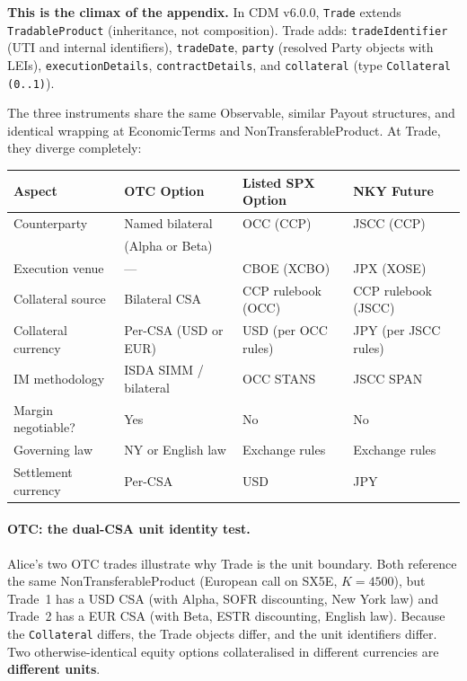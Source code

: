 \documentclass[11pt,a4paper]{article}
\begin{document}
\textbf{This is the climax of the appendix.} In CDM v6.0.0, \texttt{Trade} extends \texttt{TradableProduct} (inheritance, not composition). Trade adds: \texttt{tradeIdentifier} (UTI and internal identifiers), \texttt{tradeDate}, \texttt{party} (resolved Party objects with LEIs), \texttt{executionDetails}, \texttt{contractDetails}, and \texttt{collateral} (type \texttt{Collateral (0..1)}).

The three instruments share the same Observable, similar Payout structures, and identical wrapping at EconomicTerms and NonTransferableProduct. At Trade, they diverge completely:

\begin{center}
\small
\begin{tabular}{l l l l}
\toprule
\textbf{Aspect} & \textbf{OTC Option} & \textbf{Listed SPX Option} & \textbf{NKY Future} \\
\midrule
Counterparty & Named bilateral & OCC (CCP) & JSCC (CCP) \\
 & (Alpha or Beta) & & \\
Execution venue & --- & CBOE (XCBO) & JPX (XOSE) \\
Collateral source & Bilateral CSA & CCP rulebook (OCC) & CCP rulebook (JSCC) \\
Collateral currency & Per-CSA (USD or EUR) & USD (per OCC rules) & JPY (per JSCC rules) \\
IM methodology & ISDA SIMM / bilateral & OCC STANS & JSCC SPAN \\
Margin negotiable? & Yes & No & No \\
Governing law & NY or English law & Exchange rules & Exchange rules \\
Settlement currency & Per-CSA & USD & JPY \\
\bottomrule
\end{tabular}
\end{center}

\paragraph{OTC: the dual-CSA unit identity test.} Alice's two OTC trades illustrate why Trade is the unit boundary. Both reference the same NonTransferableProduct (European call on SX5E, $K=4500$), but Trade~1 has a USD CSA (with Alpha, SOFR discounting, New York law) and Trade~2 has a EUR CSA (with Beta, ESTR discounting, English law). Because the \texttt{Collateral} differs, the Trade objects differ, and the unit identifiers differ. Two otherwise-identical equity options collateralised in different currencies are \textbf{different units}.
\end{document}
